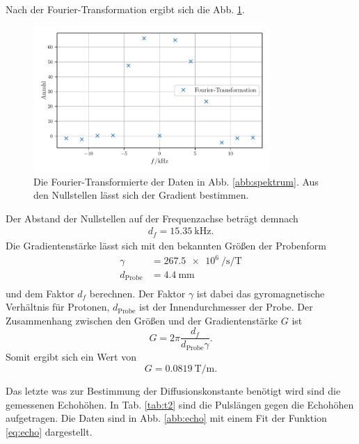 Nach der Fourier-Transformation ergibt sich die Abb. \ref{abb:fourier}.
\begin{figure}
    \centering
    \includegraphics[width=0.8\textwidth]{plots/echo_gradient.pdf}
    \caption{Die Fourier-Transformierte der Daten in Abb. \ref{abb:spektrum}. Aus den Nullstellen lässt sich der Gradient bestimmen.}
    \label{abb:fourier}
\end{figure}
Der Abstand der Nullstellen auf der Frequenzachse beträgt demnach 
\begin{align*}
d_f = \SI{15.35}{\kilo\hertz}.
\end{align*} 
Die Gradientenstärke lässt sich mit den bekannten Größen der Probenform
\begin{align*}
    \gamma &= \SI{267.5e6}{\per\second\per\tesla} \\
    d_\text{Probe} &= \SI{4.4}{\milli\metre} \\ 
    \end{align*} 
und dem Faktor $d_f$ berechnen.
Der Faktor $\gamma$ ist dabei das gyromagnetische Verhältnis für Protonen, $d_\text{Probe}$ ist der Innendurchmesser der Probe.
Der Zusammenhang zwischen den Größen und der Gradientenstärke $G$ ist
\begin{equation*}
G = 2 \pi \frac{d_f}{d_\text{Probe} \gamma}.
\end{equation*}
Somit ergibt sich ein Wert von 
\begin{equation*}
G = \SI{0.0819}{\tesla\per\metre}.
\end{equation*}



Das letzte was zur Bestimmung der Diffusionskonstante benötigt wird sind die gemessenen Echohöhen. In Tab. \ref{tab:t2} sind die Pulslängen gegen die Echohöhen aufgetragen. Die Daten sind in Abb. \ref{abb:echo} mit einem Fit der Funktion \eqref{eq:echo} dargestellt. 



